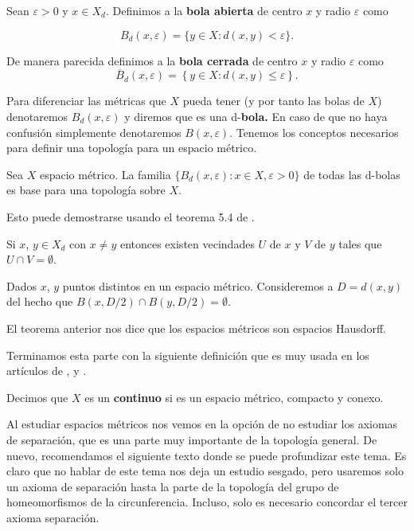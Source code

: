\label{def:top-espacios-metricos}
\begin{df}
Sean $\varepsilon > 0$ y $x\in X_d$. Definimos a la \textbf{bola abierta} de centro $x$ y radio $\varepsilon$  como

$$B_{d}(x,\varepsilon)=\{ y \in X: d(x,y)< \varepsilon \}.$$

De manera parecida definimos a la \textbf{bola cerrada} de centro $x$ y radio $\varepsilon$  como
$$\overline{B}_{d}(x,\varepsilon)=\left\lbrace y \in X: d(x,y)\leq \varepsilon \right\rbrace.$$
\end{df}

Para diferenciar las métricas que $X$ pueda tener (y por tanto las bolas de $X$) denotaremos $B_{d}(x,\varepsilon)$ y diremos que es una d-\textbf{bola.} En caso de que no haya confusión simplemente denotaremos $B(x,\varepsilon)$. Tenemos los conceptos necesarios para definir una topología para un espacio métrico.

\begin{pr}\label{prp:bolas-bse}
Sea $X$ espacio métrico. La familia $\lbrace B_{d}(x,\varepsilon): x \in X, \varepsilon > 0\rbrace$ de todas las d-bolas es base para una topología sobre $X$.
\end{pr}
Esto puede demostrarse usando el teorema 5.4 de \cite{top_willd}.


\begin{te}
Si $x$, $y \in X_{d}$ con $ x\neq y $ entonces existen vecindades $U$ de $x$ y $V$ de $y$ tales que $U \cap V=\emptyset$.
\end{te}


Dados $x$, $y$ puntos distintos en un espacio métrico. Consideremos a $D=d(x,y)$ del hecho que $B(x,D/2)\cap B(y,D/2)=\emptyset$.


\begin{ob}\label{obs:espacios-metricos-son-hausdorff}
El teorema anterior nos dice que los espacios métricos son espacios Hausdorff.
\end{ob}

Terminamos esta parte con la siguiente definición que es muy usada en los artículos de \cite{kras}, \cite{why} y \cite{moore}.

\begin{df}
Decimos que $X$ es un \textbf{continuo} si es un espacio métrico, compacto y conexo.
\end{df}

Al estudiar espacios métricos nos vemos en la opción de no estudiar los axiomas de separación, que es una parte muy importante de la topología general. De nuevo, recomendamos el siguiente texto donde se puede profundizar este tema. Es claro que no hablar de este tema nos deja un estudio sesgado, pero usaremos solo un axioma de separación hasta la parte de la topología del grupo de homeomorfismos de la circunferencia. Incluso, solo es necesario concordar el tercer axioma separación. 

